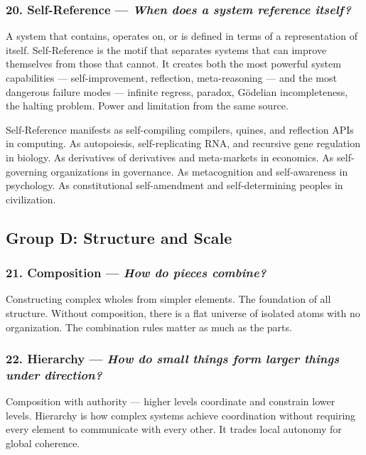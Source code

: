 \documentclass[11pt,a4paper]{article}
\newcommand{\question}[1]{\textit{#1}}
\begin{document}
\subsubsection{20. Self-Reference --- \question{When does a system reference itself?}}

A system that contains, operates on, or is defined in terms of a representation of itself. Self-Reference is the motif that separates systems that can improve themselves from those that cannot. It creates both the most powerful system capabilities --- self-improvement, reflection, meta-reasoning --- and the most dangerous failure modes --- infinite regress, paradox, G\"odelian incompleteness, the halting problem. Power and limitation from the same source.

Self-Reference manifests as self-compiling compilers, quines, and reflection APIs in computing. As autopoiesis, self-replicating RNA, and recursive gene regulation in biology. As derivatives of derivatives and meta-markets in economics. As self-governing organizations in governance. As metacognition and self-awareness in psychology. As constitutional self-amendment and self-determining peoples in civilization.

\subsection{Group D: Structure and Scale}

\subsubsection{21. Composition --- \question{How do pieces combine?}}

Constructing complex wholes from simpler elements. The foundation of all structure. Without composition, there is a flat universe of isolated atoms with no organization. The combination rules matter as much as the parts.

\subsubsection{22. Hierarchy --- \question{How do small things form larger things under direction?}}

Composition with authority --- higher levels coordinate and constrain lower levels. Hierarchy is how complex systems achieve coordination without requiring every element to communicate with every other. It trades local autonomy for global coherence.
\end{document}

